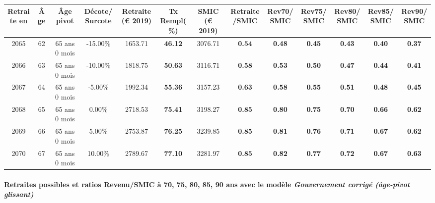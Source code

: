 { \scriptsize \begin{center} 
\begin{tabular}[htb]{|c|c||c|c||c|c||c||c|c|c|c|c|c|} 
\hline 
 Retraite en &  Âge &  Âge pivot &  Décote/Surcote &  Retraite (\euro{} 2019) &  Tx Rempl(\%) &  SMIC (\euro{} 2019) &  Retraite/SMIC &  Rev70/SMIC &  Rev75/SMIC &  Rev80/SMIC &  Rev85/SMIC &  Rev90/SMIC \\ 
\hline \hline 
 2065 &  62 &  65 ans 0 mois &  -15.00\% &  1653.71 &  {\bf 46.12} &  3076.71 &  {\bf {\color{red} 0.54}} &  {\bf {\color{red} 0.48}} &  {\bf {\color{red} 0.45}} &  {\bf {\color{red} 0.43}} &  {\bf {\color{red} 0.40}} &  {\bf {\color{red} 0.37}} \\ 
\hline 
 2066 &  63 &  65 ans 0 mois &  -10.00\% &  1818.75 &  {\bf 50.63} &  3116.71 &  {\bf {\color{red} 0.58}} &  {\bf {\color{red} 0.53}} &  {\bf {\color{red} 0.50}} &  {\bf {\color{red} 0.47}} &  {\bf {\color{red} 0.44}} &  {\bf {\color{red} 0.41}} \\ 
\hline 
 2067 &  64 &  65 ans 0 mois &  -5.00\% &  1992.34 &  {\bf 55.36} &  3157.23 &  {\bf {\color{red} 0.63}} &  {\bf {\color{red} 0.58}} &  {\bf {\color{red} 0.55}} &  {\bf {\color{red} 0.51}} &  {\bf {\color{red} 0.48}} &  {\bf {\color{red} 0.45}} \\ 
\hline 
 2068 &  65 &  65 ans 0 mois &  0.00\% &  2718.53 &  {\bf 75.41} &  3198.27 &  {\bf {\color{red} 0.85}} &  {\bf {\color{red} 0.80}} &  {\bf {\color{red} 0.75}} &  {\bf {\color{red} 0.70}} &  {\bf {\color{red} 0.66}} &  {\bf {\color{red} 0.62}} \\ 
\hline 
 2069 &  66 &  65 ans 0 mois &  5.00\% &  2753.87 &  {\bf 76.25} &  3239.85 &  {\bf {\color{red} 0.85}} &  {\bf {\color{red} 0.81}} &  {\bf {\color{red} 0.76}} &  {\bf {\color{red} 0.71}} &  {\bf {\color{red} 0.67}} &  {\bf {\color{red} 0.62}} \\ 
\hline 
 2070 &  67 &  65 ans 0 mois &  10.00\% &  2789.67 &  {\bf 77.10} &  3281.97 &  {\bf {\color{red} 0.85}} &  {\bf {\color{red} 0.82}} &  {\bf {\color{red} 0.77}} &  {\bf {\color{red} 0.72}} &  {\bf {\color{red} 0.67}} &  {\bf {\color{red} 0.63}} \\ 
\hline 
\hline 
\end{tabular} 
\end{center} } 
\paragraph{Retraites possibles et ratios Revenu/SMIC à 70, 75, 80, 85, 90 ans avec le modèle \emph{Gouvernement corrigé (âge-pivot glissant)}}  
 
